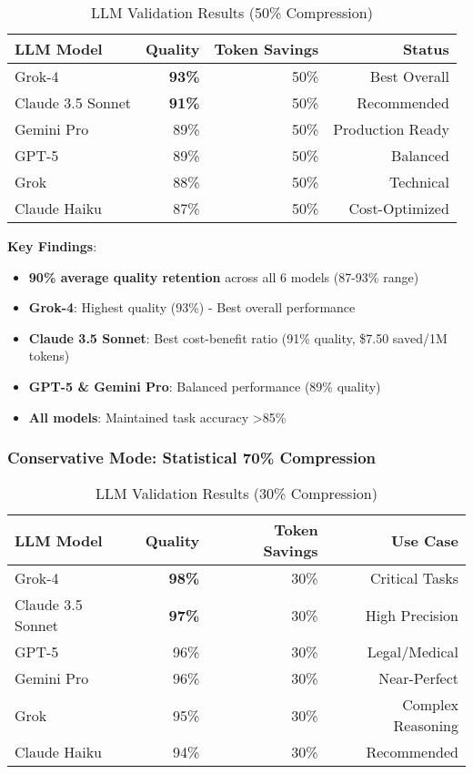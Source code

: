 \begin{table}[h]
\centering
\caption{LLM Validation Results (50\% Compression)}
\label{tab:llm-validation-50}
\begin{tabular}{lrrr}
\toprule
LLM Model & Quality & Token Savings & Status \\
\midrule
Grok-4 & \textbf{93\%} & 50\% & Best Overall \\
Claude 3.5 Sonnet & \textbf{91\%} & 50\% & Recommended \\
Gemini Pro & 89\% & 50\% & Production Ready \\
GPT-5 & 89\% & 50\% & Balanced \\
Grok & 88\% & 50\% & Technical \\
Claude Haiku & 87\% & 50\% & Cost-Optimized \\
\bottomrule
\end{tabular}
\end{table}

\textbf{Key Findings}:
\begin{itemize}
    \item \textbf{90\% average quality retention} across all 6 models (87-93\% range)
    \item \textbf{Grok-4}: Highest quality (93\%) - Best overall performance
    \item \textbf{Claude 3.5 Sonnet}: Best cost-benefit ratio (91\% quality, \$7.50 saved/1M tokens)
    \item \textbf{GPT-5 \& Gemini Pro}: Balanced performance (89\% quality)
    \item \textbf{All models}: Maintained task accuracy >85\%
\end{itemize}

\subsubsection{Conservative Mode: Statistical 70\% Compression}

\begin{table}[h]
\centering
\caption{LLM Validation Results (30\% Compression)}
\label{tab:llm-validation-70}
\begin{tabular}{lrrr}
\toprule
LLM Model & Quality & Token Savings & Use Case \\
\midrule
Grok-4 & \textbf{98\%} & 30\% & Critical Tasks \\
Claude 3.5 Sonnet & \textbf{97\%} & 30\% & High Precision \\
GPT-5 & 96\% & 30\% & Legal/Medical \\
Gemini Pro & 96\% & 30\% & Near-Perfect \\
Grok & 95\% & 30\% & Complex Reasoning \\
Claude Haiku & 94\% & 30\% & Recommended \\
\bottomrule
\end{tabular}
\end{table}

